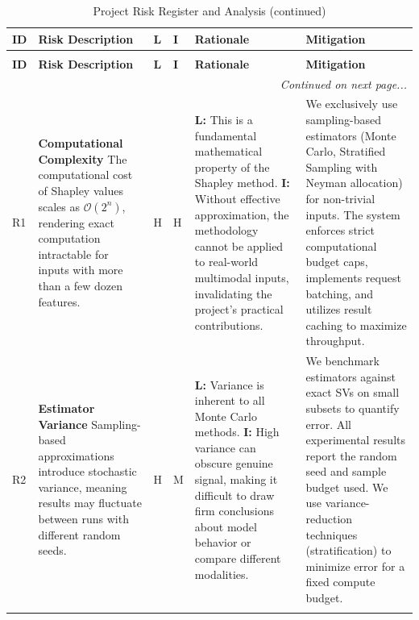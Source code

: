 \begin{appendices}
{\begin{longtable}{@{} p{0.3cm} p{4cm} p{0.2cm} p{0.2cm} p{4.6cm} p{4.6cm} @{}}
        \toprule
        \textbf{ID} & \textbf{Risk Description} & \textbf{L} & \textbf{I} & \textbf{Rationale} & \textbf{Mitigation} \\
        \midrule
        \endfirsthead

        \caption[]{Project Risk Register and Analysis (continued)} \\
        \toprule
        \textbf{ID} & \textbf{Risk Description} & \textbf{L} & \textbf{I} & \textbf{Rationale} & \textbf{Mitigation} \\
        \midrule
        \endhead

        \bottomrule
        \multicolumn{6}{r}{\footnotesize\textit{Continued on next page...}} \\
        \endfoot

        \bottomrule
        \endlastfoot

        R1 & \textbf{Computational Complexity} \newline The computational cost of Shapley values scales as $\mathcal{O}(2^n)$, rendering exact computation intractable for inputs with more than a few dozen features. & H & H & \textbf{L:} This is a fundamental mathematical property of the Shapley method. \textbf{I:} Without effective approximation, the methodology cannot be applied to real-world multimodal inputs, invalidating the project's practical contributions. & We exclusively use sampling-based estimators (Monte Carlo, Stratified Sampling with Neyman allocation) for non-trivial inputs. The system enforces strict computational budget caps, implements request batching, and utilizes result caching to maximize throughput. \\
        \addlinespace

        R2 & \textbf{Estimator Variance} \newline Sampling-based approximations introduce stochastic variance, meaning results may fluctuate between runs with different random seeds. & H & M & \textbf{L:} Variance is inherent to all Monte Carlo methods. \textbf{I:} High variance can obscure genuine signal, making it difficult to draw firm conclusions about model behavior or compare different modalities. & We benchmark estimators against exact SVs on small subsets to quantify error. All experimental results report the random seed and sample budget used. We use variance-reduction techniques (stratification) to minimize error for a fixed compute budget. \\
        \addlinespace


\end{longtable}}
\end{appendices}
